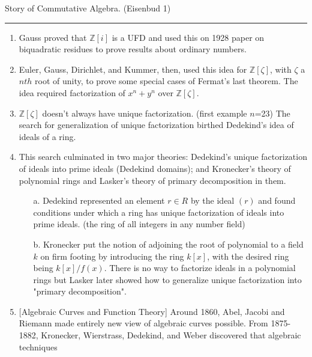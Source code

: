 \begin{notes}
      Story of Commutative Algebra. (Eisenbud 1)
\end{notes}
\hrule

\begin{enumerate}
      \item
            Gauss proved that $\mathbb{Z}[i]$ is a UFD and used this on 1928 paper on biquadratic residues to prove
            results about ordinary numbers.
      \item
            Euler, Gauss, Dirichlet, and Kummer, then, used this idea for $\mathbb{Z}
                  [\zeta]$, with $\zeta$ a $nth$ root of unity,
            to prove some special cases of Fermat's last theorem. The idea required factorization
            of $x^n+y^n$ over $\mathbb{Z}[\zeta]$.
      \item
            $\mathbb{Z}[\zeta]$ doesn't always have unique factorization. (first example
            $n$=23) The search for generalization of unique factorization birthed Dedekind's
            idea of ideals of a ring.
      \item
            This search culminated in two major theories:
            Dedekind's unique factorization of ideals into prime ideals (Dedekind
            domains); and Kronecker's theory of polynomial rings and Lasker's theory
            of primary decomposition in them.
            \begin{enumerate}
                  \item[a.]
                        Dedekind represented an element $r\in R$ by the ideal $(r)$ and found conditions
                        under which a ring has unique factorization of ideals into prime ideals. (the ring
                        of all integers in any number field)
                  \item[b.]
                        Kronecker put the notion of adjoining the root of polynomial to a field $k$ on firm footing
                        by introducing the ring $k[x]$, with the desired ring being $k[x]/f(x)$. There is no way to
                        factorize ideals in a polynomial rings but Lasker later showed how to generalize unique
                        factorization into "primary decomposition".
            \end{enumerate}
      \item
            $[$Algebraic Curves and Function Theory]
            Around 1860, Abel, Jacobi and Riemann made entirely new view of algebraic curves possible.
            From 1875-1882, Kronecker, Wierstrass, Dedekind, and Weber discovered that algebraic techniques

\end{enumerate}
